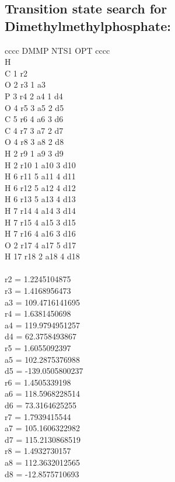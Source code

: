 \documentclass[12pt]{article}
\begin{document}
\subsection{Transition state search for Dimethylmethylphosphate:}
cccc DMMP NTS1 OPT cccc\\ 
H\\
C 1 r2\\
O 2 r3 1 a3\\
P 3 r4 2 a4 1 d4\\
O 4 r5 3 a5 2 d5\\
C 5 r6 4 a6 3 d6\\
C 4 r7 3 a7 2 d7\\
O 4 r8 3 a8 2 d8\\
H 2 r9 1 a9 3 d9\\
H 2 r10 1 a10 3 d10\\
H 6 r11 5 a11 4 d11\\
H 6 r12 5 a12 4 d12\\
H 6 r13 5 a13 4 d13\\
H 7 r14 4 a14 3 d14\\
H 7 r15 4 a15 3 d15\\
H 7 r16 4 a16 3 d16\\
O 2 r17 4 a17 5 d17\\
H 17 r18 2 a18 4 d18\\ 
\\
r2 =    1.2245104875\\
r3 =    1.4168956473\\
a3 =  109.4716141695\\
r4 =    1.6381450698\\
a4 =  119.9794951257\\
d4 =   62.3758493867\\
r5 =    1.6055092397\\
a5 =  102.2875376988\\
d5 = -139.0505800237\\
r6 =    1.4505339198\\
a6 =  118.5968228514\\
d6 =   73.3164625255\\
r7 =    1.7939415544\\
a7 =  105.1606322982\\
d7 =  115.2130868519\\
r8 =    1.4932730157\\
a8 =  112.3632012565\\
d8 =  -12.8575710693\\
\end{document}
